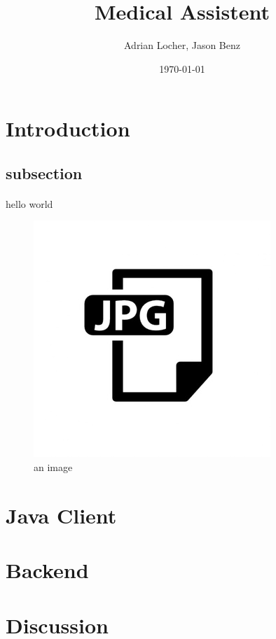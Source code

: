 \documentclass[11pt, letterpaper]{article}
\title{Medical Assistent}
\author{Adrian Locher, Jason Benz}
\date{\today}
\begin{document}
\maketitle

\newpage
\tableofcontents
\newpage


\section{Introduction}
    \subsection{subsection}
        \paragraph{}
            hello world
            \begin{figure}[h!]
                \includegraphics[]{ressources/img.jpg}
                \caption{an image}
                \label{fig:image1}
            \end{figure}

\newpage

\section{Java Client}

\newpage

\section{Backend}

\newpage

\section{Discussion}
\end{document}
